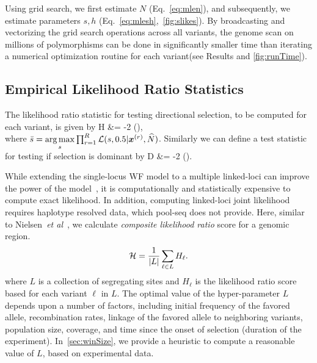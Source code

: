 Using grid search, we first estimate $N$ (Eq.~\ref{eq:mlen}), and
subsequently, we estimate parameters $s,h$ 
(Eq.~\ref{eq:mlesh},~\ref{fig:slikes}). By
broadcasting and vectorizing the grid search operations across all
variants, the genome scan on millions of polymorphisms can be done in
significantly smaller time than iterating a numerical optimization
routine for each variant(see Results and \ref{fig:runTime}).
\subsection{Empirical Likelihood Ratio Statistics}
The  likelihood
ratio statistic for testing directional selection, to be computed for each variant, 
is given by
\beq
	H &= -2 \log 
	\left(\right),\\
	\label{eq:ELRS}
\eeq
where $\bar{s} = \underset{s}{\arg \max} \prod_{r=1}^R 
 {\cal L}(s,0.5|\bm{x}^{(r)},\widehat{N})$. Similarly we can define a test statistic for testing 
 if selection is dominant by
\beq
 D &= -2 \log 
 \left(\right).
 \eeq



 While extending the single-locus WF model to a multiple linked-loci
 can improve the power of the model~\cite{Terhorst2015Multi}, it is
 computationally and statistically expensive to compute exact
 likelihood. In addition, computing linked-loci joint likelihood requires  
 haplotype resolved data, which pool-seq
 does not provide. Here, similar to Nielsen~\emph{et
   al}~\cite{nielsen2005genomic}, we calculate \emph{composite likelihood
 ratio} score for a genomic region.
\begin{equation}
{\cal H} = \frac{1}{|L|}\sum_{\ell \in L} H_\ell.
\label{eq:pihmm}
\end{equation}
where $L$ is a collection of segregating sites and $H_\ell$ is the
likelihood ratio score based for each variant $\ell$ in $L$.  The
optimal value of the hyper-parameter $L$ depends upon a number of
factors, including initial frequency of the favored allele,
recombination rates, linkage of the favored allele to neighboring
variants, population size, coverage, and time since the onset of
selection (duration of the experiment). In~\ref{sec:winSize}, we
provide a heuristic to compute a reasonable value of $L$, based on
experimental data.

